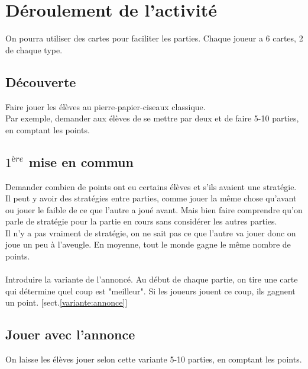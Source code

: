 \documentclass{article}
\begin{document}
\newpage
\section{Déroulement de l'activité}
On pourra utiliser des cartes pour faciliter les parties. Chaque joueur a 6 cartes, 2 de chaque type.

\subsection{Découverte}
Faire jouer les élèves au pierre-papier-ciseaux classique.\\
Par exemple, demander aux élèves de se mettre par deux et de faire 5-10 parties, en comptant les points.
\subsection{$1^{ère}$ mise en commun}
Demander combien de points ont eu certains élèves et s'ils avaient une stratégie. 
Il peut y avoir des stratégies entre parties, comme jouer la même chose qu'avant ou jouer le faible de ce que l'autre a joué avant. Mais bien faire comprendre qu'on parle de stratégie pour la partie en cours sans considérer les autres parties.\\
Il n'y a pas vraiment de stratégie, on ne sait pas ce que l'autre va jouer donc on joue un peu à l'aveugle. En moyenne, tout le monde gagne le même nombre de points.
\\
\\
Introduire la variante de l'annoncé. Au début de chaque partie, on tire une carte qui détermine quel coup est "meilleur". Si les joueurs jouent ce coup, ils gagnent un point. [sect.\ref{variante:annonce}]
\subsection{Jouer avec l'annonce}
On laisse les élèves jouer selon cette variante 5-10 parties, en comptant les points.
\end{document}
